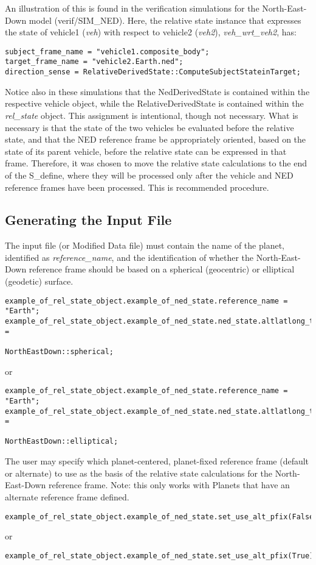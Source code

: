 An illustration of this is found in the verification simulations for the North-East-Down model (verif/SIM\_NED).  Here, the relative state instance that expresses the state of vehicle1 (\textit{veh}) with respect to vehicle2 (\textit{veh2}), \textit{veh\_wrt\_veh2}, has:
\begin{verbatim}
subject_frame_name = "vehicle1.composite_body";
target_frame_name = "vehicle2.Earth.ned";
direction_sense = RelativeDerivedState::ComputeSubjectStateinTarget;
\end{verbatim}

Notice also in these simulations that the NedDerivedState is contained within the respective vehicle object, while the RelativeDerivedState is contained within the \textit{rel\_state} object.  This assignment is intentional, though not necessary.  What is necessary is that the state of the two vehicles be evaluated before the relative state, and that the NED reference frame be appropriately oriented, based on the state of its parent vehicle, before the relative state can be expressed in that frame.  Therefore, it was chosen to move the relative state calculations to the end of the S\_define, where they will be processed only after the vehicle and NED reference frames have been processed.  This is recommended procedure.

\subsection{Generating the Input File}
The input file (or Modified Data file) must contain the name of the planet, identified as \textit{reference\_name}, and the identification of whether the North-East-Down reference frame should be based on a spherical (geocentric) or elliptical (geodetic) surface.
\begin{verbatim}
example_of_rel_state_object.example_of_ned_state.reference_name = "Earth";
example_of_rel_state_object.example_of_ned_state.ned_state.altlatlong_type = 
                                                       NorthEastDown::spherical;
\end{verbatim}
or
\begin{verbatim}
example_of_rel_state_object.example_of_ned_state.reference_name = "Earth";
example_of_rel_state_object.example_of_ned_state.ned_state.altlatlong_type = 
                                                     NorthEastDown::elliptical;
\end{verbatim}

The user may specify which planet-centered, planet-fixed reference frame (default or alternate) to use as the basis of the relative state calculations for the North-East-Down reference frame. Note: this only works with Planets that have an alternate reference frame defined.
\begin{verbatim}
example_of_rel_state_object.example_of_ned_state.set_use_alt_pfix(False);

\end{verbatim}
or
\begin{verbatim}
example_of_rel_state_object.example_of_ned_state.set_use_alt_pfix(True);

\end{verbatim}


